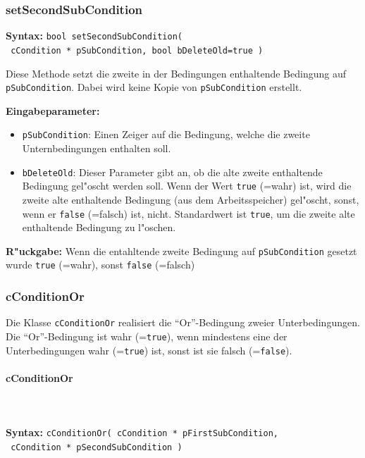 \subsubsection{setSecondSubCondition}

\textbf{Syntax:} \verb|bool setSecondSubCondition(| \\\verb| cCondition * pSubCondition, bool bDeleteOld=true )|

\bigskip\noindent
Diese Methode setzt die zweite in der Bedingungen enthaltende Bedingung auf \verb|pSubCondition|. Dabei wird keine Kopie von \verb|pSubCondition| erstellt.

\bigskip\noindent
\textbf{Eingabeparameter:}
\begin{itemize}
 \item \verb|pSubCondition|: Einen Zeiger auf die Bedingung, welche die zweite Unternbedingungen enthalten soll.
 \item \verb|bDeleteOld|: Dieser Parameter gibt an, ob die alte zweite enthaltende Bedingung gel"oscht werden soll. Wenn der Wert \verb|true| (=wahr) ist, wird die zweite alte enthaltende Bedingung (aus dem Arbeitsspeicher) gel"oscht, sonst, wenn er \verb|false| (=falsch) ist, nicht. Standardwert ist \verb|true|, um die zweite alte enthaltende Bedingung zu l"oschen.
\end{itemize}

\bigskip\noindent
\textbf{R"uckgabe:} Wenn die entahltende zweite Bedingung auf \verb|pSubCondition| gesetzt wurde \verb|true| (=wahr), sonst \verb|false| (=falsch)


\subsubsection{cConditionOr}

Die Klasse \verb|cConditionOr| realisiert die ``Or''-Bedingung zweier Unterbedingungen. Die ``Or''-Bedingung ist wahr (=\verb|true|), wenn mindestens eine der Unterbedingungen wahr (=\verb|true|) ist, sonst ist sie falsch  (=\verb|false|).

\paragraph{cConditionOr}

\ \\\\\noindent
\textbf{Syntax:} \verb|cConditionOr( cCondition * pFirstSubCondition,| \\\verb| cCondition * pSecondSubCondition )|

